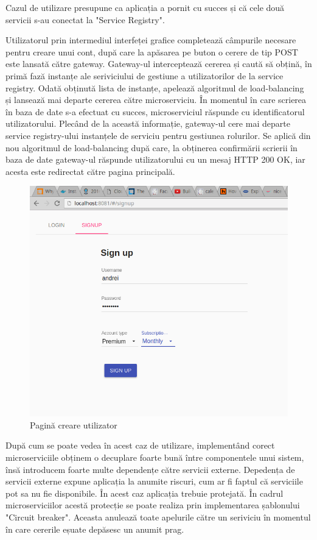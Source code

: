 \documentclass[12pt, a4paper, oneside, romanian]{teza-upb}
\begin{document}
Cazul de utilizare presupune ca aplicația a pornit cu succes și că cele două servicii s-au conectat la "Service Registry". 


Utilizatorul prin intermediul interfeței grafice completează câmpurile necesare pentru creare unui cont, după care la apăsarea pe buton o cerere de tip POST este lansată către gateway. Gateway-ul interceptează cererea și caută să obțină, în primă fază instanțe ale seriviciului de gestiune a utilizatorilor de la service registry. Odată obținută lista de instanțe, apelează algoritmul de load-balancing și lansează mai departe cererea către microserviciu. În momentul în care scrierea în baza de date s-a efectuat cu succes, microserviciul răspunde cu identificatorul utilizatorului. Plecând de la această informație, gateway-ul cere mai departe service registry-ului instanțele de serviciu pentru gestiunea rolurilor. Se aplică din nou algoritmul de load-balancing după care, la obținerea confirmării scrierii în baza de date gateway-ul răspunde utilizatorului cu un mesaj HTTP 200 OK, iar acesta este redirectat către pagina principală. 

\newpage
\begin{figure}[ht]
\centering
\includegraphics[scale=0.5]{img/login_screen.png}
\caption{Pagină creare utilizator}
\label{fig:arhi_componente}
\end{figure}

După cum se poate vedea în acest caz de utilizare, implementând corect microserviciile obținem o decuplare foarte bună între componentele unui sistem, însă introducem foarte multe dependențe către servicii externe. Depedența de servicii externe expune aplicația la anumite riscuri, cum ar fi faptul că serviciile pot sa nu fie disponibile. În acest caz aplicația trebuie protejată. În cadrul microserviciilor acestă protecție se poate realiza prin implementarea șablonului "Circuit breaker". Aceasta anulează toate apelurile către un  seriviciu în momentul în care cererile eșuate depăsesc un anumit prag. 
\end{document}
